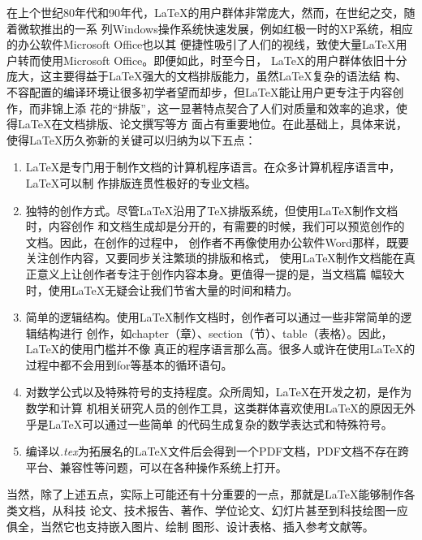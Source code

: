 在上个世纪80年代和90年代，LaTeX的用户群体非常庞大，然而，在世纪之交，随着微软推出的一系
列Windows操作系统快速发展，例如红极一时的XP系统，相应的办公软件Microsoft Office也以其
便捷性吸引了人们的视线，致使大量LaTeX用户转而使用Microsoft Office。即便如此，时至今日，
LaTeX的用户群体依旧十分庞大，这主要得益于LaTeX强大的文档排版能力，虽然LaTeX复杂的语法结
构、不容配置的编译环境让很多初学者望而却步，但LaTeX能让用户更专注于内容创作，而非锦上添
花的“排版”，这一显著特点契合了人们对质量和效率的追求，使得LaTeX在文档排版、论文撰写等方
面占有重要地位。在此基础上，具体来说，使得LaTeX历久弥新的关键可以归纳为以下五点：
\begin{enumerate}
    \item LaTeX是专门用于制作文档的计算机程序语言。在众多计算机程序语言中，LaTeX可以制
          作排版连贯性极好的专业文档。
    \item 独特的创作方式。尽管LaTeX沿用了TeX排版系统，但使用LaTeX制作文档时，内容创作
          和文档生成却是分开的，有需要的时候，我们可以预览创作的文档。因此，在创作的过程中，
          创作者不再像使用办公软件Word那样，既要关注创作内容，又要同步关注繁琐的排版和格式，
          使用LaTeX制作文档能在真正意义上让创作者专注于创作内容本身。更值得一提的是，当文档篇
          幅较大时，使用LaTeX无疑会让我们节省大量的时间和精力。
    \item 简单的逻辑结构。使用LaTeX制作文档时，创作者可以通过一些非常简单的逻辑结构进行
          创作，如chapter（章）、section（节）、table（表格）。因此，LaTeX的使用门槛并不像
          真正的程序语言那么高。很多人或许在使用LaTeX的过程中都不会用到for等基本的循环语句。
    \item 对数学公式以及特殊符号的支持程度。众所周知，LaTeX在开发之初，是作为数学和计算
          机相关研究人员的创作工具，这类群体喜欢使用LaTeX的原因无外乎是LaTeX可以通过一些简单
          的代码生成复杂的数学表达式和特殊符号。
    \item 编译以\emph{.tex}为拓展名的LaTeX文件后会得到一个PDF文档，PDF文档不存在跨
          平台、兼容性等问题，可以在各种操作系统上打开。
\end{enumerate}

当然，除了上述五点，实际上可能还有十分重要的一点，那就是LaTeX能够制作各类文档，从科技
论文、技术报告、著作、学位论文、幻灯片甚至到科技绘图一应俱全，当然它也支持嵌入图片、绘制
图形、设计表格、插入参考文献等。

